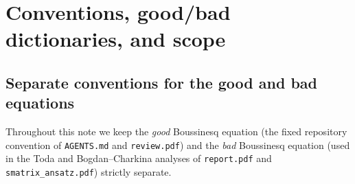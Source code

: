 \documentclass[11pt,a4paper]{article}
\newcommand{\Ld}{\textsf{\textbf{(d)}}}
\theoremstyle{remark}
\begin{document}
\begin{abstract}
\begin{enumerate}
\item \textbf{Twisted $N$-soliton ring Bethe equations from topological cross terms.}
Transporting soliton $j$ around a ring of circumference $\Lambda$ across the seam shifts its Darboux coordinate by $\Delta_{\rm seam}X_j'=\Lambda+\gamma_j\sum_{l\neq j}M_l$ and drops the seam potential $\phi(0^+)$ by $M_j$, producing the Aharonov--Bohm $\phi$-winding twist $+\Pi_j M_l$. The resulting twisted directional Bethe phase $\Phi_{\rm ring}(j\mid l)=\delta(j,l)+\Pi_j M_l$ satisfies $-\partial_{P_j}\Phi_{\rm ring}(j\mid l)=\Delta x_{jl}=-\frac{1}{k_j}\ln A_{jl}$ (the exact Hirota shift), obeys the global translation-winding sum rule $P_{\rm tot}\Lambda+\Pi_{\rm tot}M_{\rm tot}=2\pi\hbar\sum_j n_j$, and fuses covariantly onto Bogdan--Charkina breathers.
\item \textbf{Minimal residual ambiguity and package interfaces.}
After (i)--(v), the residual freedom at $O(\hbar^0)$ reduces to a single real antisymmetric overtaking phase $\vartheta_{\rm ov}(1,2)=-\vartheta_{\rm ov}(2,1)$, with $\vartheta_{\rm ho}(\beta_1,\beta_2)=-\vartheta_{\rm ov}(\beta_1,\beta_2+i\pi)$ fixed by crossing. We prove the exact crossing identity $I_{12}^{\rm same}(\alpha_1,\alpha_2+\pi)=-I_{12}^{\rm head}(\alpha_1,\alpha_2)$ and $J_{12}^{\rm same}(\alpha_1,\alpha_2+\pi)+J_{12}^{\rm head}(\alpha_1,\alpha_2)=+\pi/2$ for the one-loop continuum integrals, showing that the $+\pi/2$ cusp jump of $J_{12}$ across $\alpha_2=\pi/3$ cancels the $+\pi/2$ Stirling offset of $S_{\Gamma,\rm ho}$, and state the exact interface formulas to the projected determinant (\texttt{det\_*}) and quantum frame (\texttt{frame\_*}) packages.
\end{enumerate}
Every candidate passing tests remains a guess \Ld\ until derived from a quantum theory.
\end{abstract}

\tableofcontents

\section{Conventions, good/bad dictionaries, and scope}\label{sec:dict}

\subsection{Separate conventions for the good and bad equations}
Throughout this note we keep the \emph{good} Boussinesq equation (the fixed repository convention of \texttt{AGENTS.md} and \texttt{review.pdf}) and the \emph{bad} Boussinesq equation (used in the Toda and Bogdan--Charkina analyses of \texttt{report.pdf} and \texttt{smatrix\_ansatz.pdf}) strictly separate.
\end{document}
